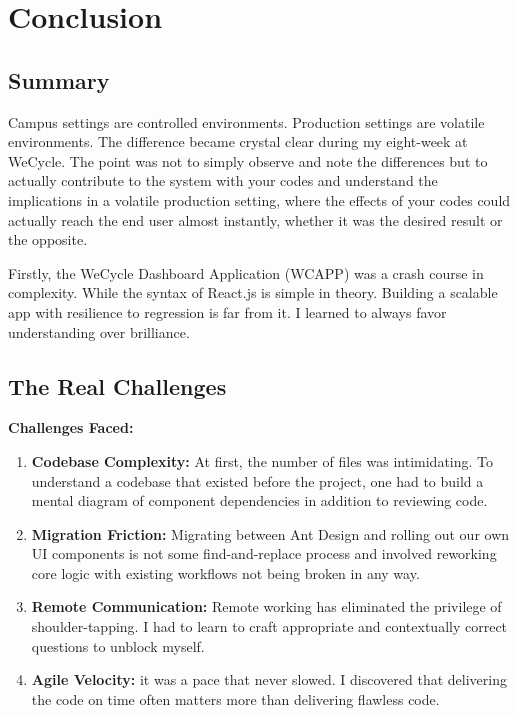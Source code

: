 \chapter{Conclusion}
\label{chapter-5}

\section{Summary}

\par Campus settings are controlled environments. Production settings are volatile environments. The difference became crystal clear during my eight-week at WeCycle. The point was not to simply observe and note the differences but to actually contribute to the system with your codes and understand the implications in a volatile production setting, where the effects of your codes could actually reach the end user almost instantly, whether it was the desired result or the opposite.

\par Firstly, the WeCycle Dashboard Application (WCAPP) was a crash course in complexity. While the syntax of React.js is simple in theory. Building a scalable app with resilience to regression is far from it. I learned to always favor understanding over brilliance.

\section{The Real Challenges}

\par \textbf{Challenges Faced:}
\begin{enumerate}
    \item \textbf{Codebase Complexity:} At first, the number of files was intimidating. To understand a codebase that existed before the project, one had to build a mental diagram of component dependencies in addition to reviewing code.
    \item \textbf{Migration Friction:} Migrating between Ant Design and rolling out our own UI components is not some find-and-replace process and involved reworking core logic with existing workflows not being broken in any way.
    \item \textbf{Remote Communication:}
    Remote working has eliminated the privilege of shoulder-tapping. I had to learn to craft appropriate and contextually correct questions to unblock myself.
    \item \textbf{Agile Velocity:} it was a pace that never slowed. I discovered that delivering the code on time often matters more than delivering flawless code.
\end{enumerate}

